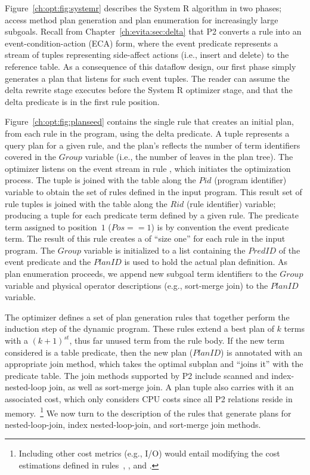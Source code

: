 Figure~\ref{ch:opt:fig:systemr} describes the System R algorithm in two phases;
access method plan generation and plan enumeration for increasingly large
subgoals.  Recall from Chapter~\ref{ch:evita:sec:delta} that P2 converts a rule
into an event-condition-action (ECA) form, where the event predicate represents
a stream of tuples representing side-affect actions (i.e., insert and delete)
to the reference table.  As a consequence of this dataflow design, our first
phase simply generates a plan that listens for such event tuples.  The reader
can assume the delta rewrite stage executes before the System R optimizer
stage, and that the delta predicate is in the first rule position.

Figure~\ref{ch:opt:fig:planseed} contains the single rule that creates an
initial plan, from each rule in the program, using the delta predicate.  A
 tuple represents a query plan for a given rule, and the plan's
 reflects the number of term identifiers covered in the $Group$
variable (i.e., the number of leaves in the plan tree).  The optimizer listens
on the  event stream in rule , which
initiates the optimization process.  The  tuple is
joined with the  table along the $Pid$ (program identifier)
variable to obtain the set of rules defined in the input program.  This result
set of rule tuples is joined with the  table along the
$Rid$ (rule identifier) variable; producing a tuple for each predicate term
defined by a given rule.  The predicate term assigned to position~$1$ ($Pos ==
1$) is by convention the event predicate term.  The result of this rule creates 
a  of ``size one'' for each rule in the input program.  The
$Group$ variable is initialized to a list containing the $PredID$ of the event
predicate and the $PlanID$ is used to hold the actual plan definition.  As plan
enumeration proceeds, we append new subgoal term identifiers to the $Group$
variable and physical operator descriptions (e.g., sort-merge join) to the
$PlanID$ variable.

The \OVERLOG optimizer defines a set of plan generation rules that together
perform the induction step of the dynamic program.  These rules extend a best
plan of $k$ terms with a $(k+1)^{st}$, thus far unused term from the rule body.
If the new term considered is a table predicate, then the new plan ($PlanID$)
is annotated with an appropriate join method, which takes the optimal subplan
and ``joins it'' with the predicate table.  The join methods supported by P2
include scanned and index-nested-loop join, as well as sort-merge join.  A plan
tuple also carries with it an associated cost, which only considers CPU costs
since all P2 relations reside in memory.~\footnote{Including other cost metrics
(e.g., I/O) would entail modifying the cost estimations defined in
rules~, , and .}  We now turn to the description of
the rules that generate plans for nested-loop-join, index nested-loop-join, and
sort-merge join methods.

